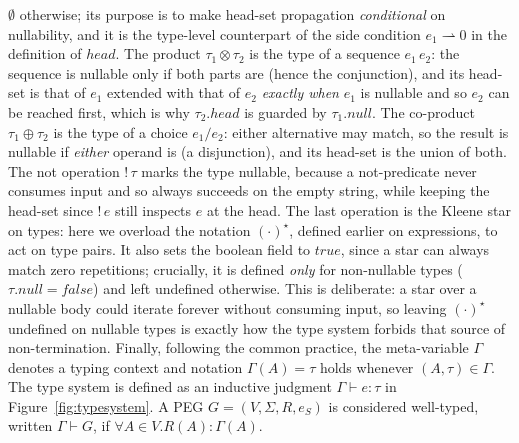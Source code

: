 \documentclass[preprint,12pt]{elsarticle}
\theoremstyle{definition}
\begin{document}
$\emptyset$ otherwise; its purpose is to make head-set propagation
\emph{conditional} on nullability, and it is the type-level counterpart of the
side condition $e_1 \rightharpoonup 0$ in the definition of $head$. The product
$\tau_1 \otimes \tau_2$ is the type of a sequence $e_1\,e_2$: the sequence is
nullable only if both parts are (hence the conjunction), and its head-set is that
of $e_1$ extended with that of $e_2$ \emph{exactly when} $e_1$ is nullable and so
$e_2$ can be reached first, which is why $\tau_2.head$ is guarded by
$\tau_1.null$. The co-product $\tau_1 \oplus \tau_2$ is the type of a choice
$e_1 / e_2$: either alternative may match, so the result is nullable if
\emph{either} operand is (a disjunction), and its head-set is the union of both.
The not operation $!\,\tau$ marks the type nullable, because a not-predicate never
consumes input and so always succeeds on the empty string, while keeping the
head-set since $!\,e$ still inspects $e$ at the head. The last operation is the
Kleene star on types: here we overload the notation $(\cdot)^\star$, defined
earlier on expressions, to act on type pairs. It also sets the boolean field to
$true$, since a star can always match zero repetitions; crucially, it is defined
\emph{only} for non-nullable types ($\tau.null = false$) and left undefined
otherwise. This is deliberate: a star over a nullable body could iterate forever
without consuming input, so leaving $(\cdot)^\star$ undefined on nullable types is
exactly how the type system forbids that source of non-termination. Finally, following the common practice, the meta-variable
$\Gamma$ denotes a typing context and notation $\Gamma(A) = \tau$ holds whenever
$(A,\tau) \in \Gamma$.
The type system is defined as an inductive judgment
$\Gamma \vdash e : \tau$ in Figure~\ref{fig:typesystem}. A
PEG $G = (V,\Sigma,R,e_S)$ is considered well-typed, written $\Gamma \vdash G$,
if $\forall A \in V . R(A) : \Gamma (A)$.
\end{document}
